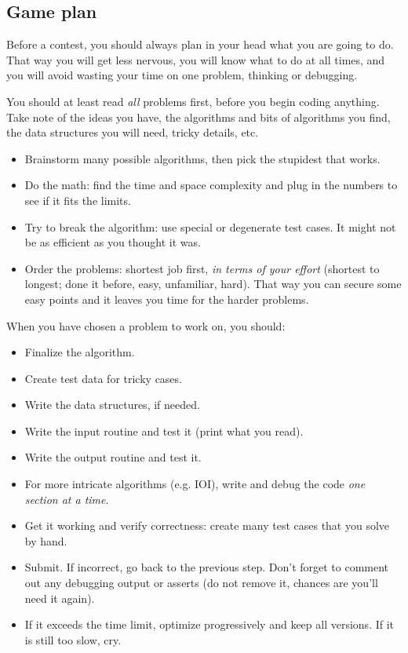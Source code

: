 \subsection{Game plan}

Before a contest, you should always plan in your head what you are going to do.
That way you will get less nervous, you will know what to do at all times,
and you will avoid wasting your time on one problem, thinking or debugging.

You should at least read \emph{all} problems first,
before you begin coding anything.
Take note of the ideas you have, the algorithms and bits of algorithms you find,
the data structures you will need, tricky details, etc.
\begin{itemize}
    \item Brainstorm many possible algorithms,
        then pick the stupidest that works.
    \item Do the math: find the time and space complexity and plug in the
        numbers to see if it fits the limits.
    \item Try to break the algorithm: use special or degenerate test cases.
        It might not be as efficient as you thought it was.
    \item Order the problems: shortest job first,
        \emph{in terms of your effort}
        (shortest to longest; done it before, easy, unfamiliar, hard).
        That way you can secure some easy points and it leaves you time for the
        harder problems.
\end{itemize}

When you have chosen a problem to work on, you should:
\begin{itemize}
    \item Finalize the algorithm.
    \item Create test data for tricky cases.
    \item Write the data structures, if needed.
    \item Write the input routine and test it (print what you read).
    \item Write the output routine and test it.
    \item For more intricate algorithms (e.g. IOI), write and debug the code
        \emph{one section at a time}.
    \item Get it working and verify correctness: create many test cases
        that you solve by hand.
    \item Submit. If incorrect, go back to the previous step. Don't forget to
        comment out any debugging output or asserts (do not remove it,
        chances are you'll need it again).
    \item If it exceeds the time limit, optimize progressively and keep all
        versions. If it is still too slow, cry.
\end{itemize}
